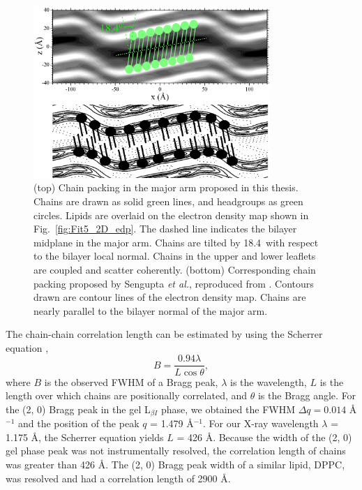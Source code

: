 \begin{figure}
  \centering
  \includegraphics[width=0.8\textwidth]{figures/ripple/discussion/major-arm_cartoon}
  \caption[(top) Chain packing in the major arm proposed in this thesis]
  {(top) Chain packing in the major arm proposed in this thesis.
  Chains are drawn as solid green lines, and headgroups as green circles.
  Lipids are overlaid on the electron density map shown in Fig.~\ref{fig:Fit5_2D_edp}.
  The dashed line indicates the bilayer midplane in the major arm.
  Chains are tilted by 18.4\textdegree\ with respect to the bilayer local normal. 
  Chains in the upper and lower leaflets are coupled and scatter coherently. 
  (bottom) Corresponding chain packing proposed by
  Sengupta \textit{et al.}, reproduced from \cite{ref:Sengupta03}. 
  Contours drawn are contour lines of the electron density map.
  Chains are nearly parallel to the bilayer normal of the major arm.}
  \label{fig:major-arm_cartoon}
\end{figure}

The chain-chain correlation length can be estimated by using the Scherrer equation 
\cite{ref:Warren69},
\[
  B = \frac{0.94\lambda}{L\cos\theta},
\]
where $B$ is the observed FWHM of a Bragg peak, $\lambda$ is the wavelength,
$L$ is the length over which chains are positionally correlated, 
and $\theta$ is the Bragg angle. For the (2, 0) Bragg peak in
the gel L$_{\beta I}$ phase, we obtained the FWHM $\Delta q = 0.014$ \AA$^{-1}$ and
the position of the peak $q$ = 1.479 \AA$^{-1}$. For our X-ray wavelength
$\lambda$ = 1.175 \AA, the Scherrer equation yields $L$ = 426 \AA. 
Because the width of the (2, 0) gel phase peak 
was not instrumentally resolved, the correlation length of chains was 
greater than 426 \AA.
The (2, 0) Bragg peak width of a 
similar lipid, DPPC, was resolved and had a correlation 
length of 2900 \AA \cite{ref:Sun94}.

